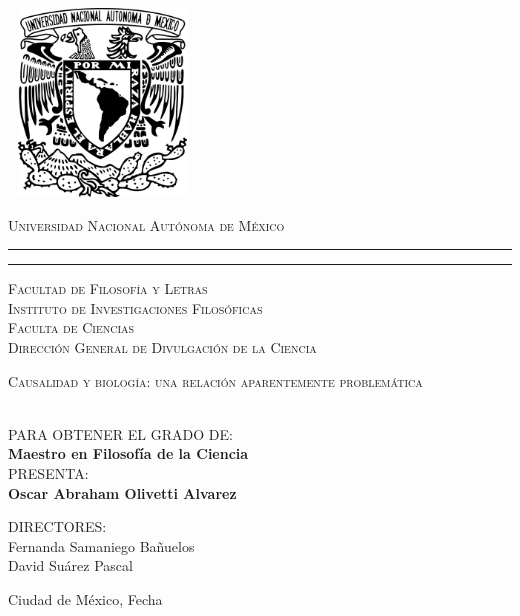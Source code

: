\thispagestyle{empty}

\begin{center}

	\includegraphics[width=5cm, height=5cm]{Portada/escudo.png}
		
	{\scshape Universidad Nacional Aut\'onoma de M\'exico}
	\vspace{.3cm}
	\hrule height2.5pt
	\vspace{.1cm}
	\hrule height1pt
	\vspace{.3cm}
	\scshape{Facultad de Filosofía y Letras \\ 
			Instituto de Investigaciones Filosóficas \\
			Faculta de Ciencias \\
			Dirección General de Divulgación de la Ciencia}
	
		\vspace{0.5cm}
				
		{\Large \scshape {Causalidad y biología: una relación aparentemente problemática  }}
		
		\vspace{0.5cm}
		
		  \\[8pt]
		PARA OBTENER EL GRADO DE:\\[5pt]
		{\large \textbf{{Maestro en Filosofía de la Ciencia}}}\\[40pt]            
		PRESENTA:\\[4pt]
		\textbf{{Oscar Abraham Olivetti Alvarez}}
		
		\vspace{0.5cm}
		
		{\small DIRECTORES:\\ {Fernanda Samaniego Bañuelos} \\ {David Suárez Pascal}}
		
		\vspace{0.5cm}
		
		{Ciudad de México,}{ }{Fecha}
\end{center}
	
